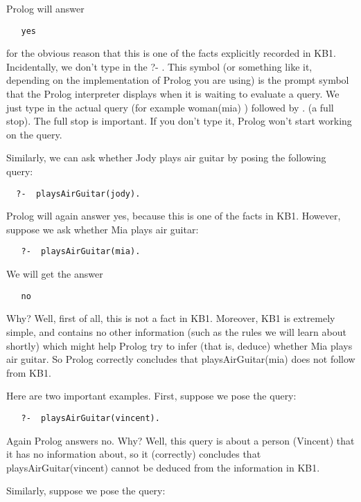 Prolog will answer

\begin{verbatim} 
   yes
\end{verbatim}
   
for the obvious reason that this is one of the facts explicitly recorded in KB1.
Incidentally, we don’t type in the ?- . This symbol (or something like it,
depending on the implementation of Prolog you are using) is the prompt symbol
that the Prolog interpreter displays when it is waiting to evaluate a query. We
just type in the actual query (for example woman(mia) ) followed by . (a full
stop). The full stop is important. If you don’t type it, Prolog won’t start
working on the query.

Similarly, we can ask whether Jody plays air guitar by posing the following
query:

\begin{verbatim} 
  ?-  playsAirGuitar(jody).
\end{verbatim}

Prolog will again answer yes, because this is one of the facts in KB1. However,
suppose we ask whether Mia plays air guitar:

\begin{verbatim} 
   ?-  playsAirGuitar(mia).
\end{verbatim}

We will get the answer

\begin{verbatim} 
   no
\end{verbatim}

Why? Well, first of all, this is not a fact in KB1. Moreover, KB1 is extremely
simple, and contains no other information (such as the rules we will learn about
shortly) which might help Prolog try to infer (that is, deduce) whether Mia
plays air guitar. So Prolog correctly concludes that playsAirGuitar(mia) does
not follow from KB1.

Here are two important examples. First, suppose we pose the query:

\begin{verbatim} 
   ?-  playsAirGuitar(vincent).
\end{verbatim}

Again Prolog answers no. Why? Well, this query is about a person (Vincent) that
it has no information about, so it (correctly) concludes that
playsAirGuitar(vincent) cannot be deduced from the information in KB1.

Similarly, suppose we pose the query:

